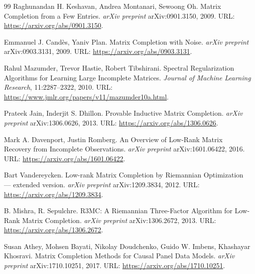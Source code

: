 \documentclass[a4paper,12pt]{article}
\begin{document}
\begin{thebibliography}{99}
Raghunandan H. Keshavan, Andrea Montanari, Sewoong Oh.
\newblock Matrix Completion from a Few Entries.
\newblock \textit{arXiv preprint} arXiv:0901.3150, 2009.
\newblock URL: \url{https://arxiv.org/abs/0901.3150}.

Emmanuel J. Cand\`es, Yaniv Plan.
\newblock Matrix Completion with Noise.
\newblock \textit{arXiv preprint} arXiv:0903.3131, 2009.
\newblock URL: \url{https://arxiv.org/abs/0903.3131}.

Rahul Mazumder, Trevor Hastie, Robert Tibshirani.
\newblock Spectral Regularization Algorithms for Learning Large Incomplete Matrices.
\newblock \textit{Journal of Machine Learning Research}, 11:2287--2322, 2010.
\newblock URL: \url{https://www.jmlr.org/papers/v11/mazumder10a.html}.

Prateek Jain, Inderjit S. Dhillon.
\newblock Provable Inductive Matrix Completion.
\newblock \textit{arXiv preprint} arXiv:1306.0626, 2013.
\newblock URL: \url{https://arxiv.org/abs/1306.0626}.

Mark A. Davenport, Justin Romberg.
\newblock An Overview of Low-Rank Matrix Recovery from Incomplete Observations.
\newblock \textit{arXiv preprint} arXiv:1601.06422, 2016.
\newblock URL: \url{https://arxiv.org/abs/1601.06422}.

Bart Vandereycken.
\newblock Low-rank Matrix Completion by Riemannian Optimization --- extended version.
\newblock \textit{arXiv preprint} arXiv:1209.3834, 2012.
\newblock URL: \url{https://arxiv.org/abs/1209.3834}.

B. Mishra, R. Sepulchre.
\newblock R3MC: A Riemannian Three-Factor Algorithm for Low-Rank Matrix Completion.
\newblock \textit{arXiv preprint} arXiv:1306.2672, 2013.
\newblock URL: \url{https://arxiv.org/abs/1306.2672}.

Susan Athey, Mohsen Bayati, Nikolay Doudchenko, Guido W. Imbens, Khashayar Khosravi.
\newblock Matrix Completion Methods for Causal Panel Data Models.
\newblock \textit{arXiv preprint} arXiv:1710.10251, 2017.
\newblock URL: \url{https://arxiv.org/abs/1710.10251}.

\end{thebibliography}
\end{document}
